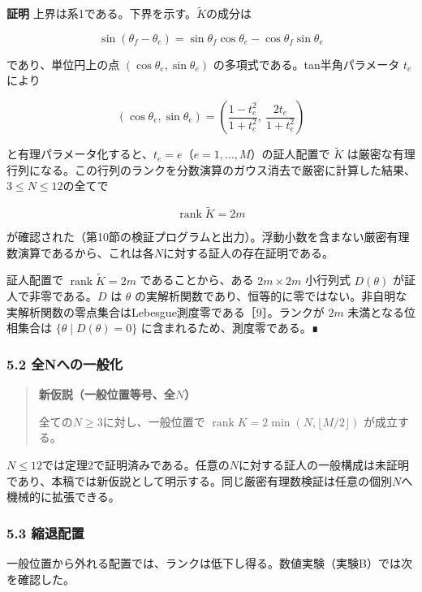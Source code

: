 \documentclass[
  a4paper,
]{ltjsarticle}
\begin{document}
\textbf{証明} 上界は系1である。下界を示す。\(\widetilde K\)の成分は

\[
\sin(\theta_f-\theta_e)
=
\sin\theta_f\cos\theta_e-\cos\theta_f\sin\theta_e
\]

であり、単位円上の点 \((\cos\theta_e,\sin\theta_e)\)
の多項式である。tan半角パラメータ \(t_e\) により

\[
(\cos\theta_e,\sin\theta_e)
=
\left(\frac{1-t_e^2}{1+t_e^2},\ \frac{2t_e}{1+t_e^2}\right)
\]

と有理パラメータ化すると、\(t_e=e\)（\(e=1,\dots,M\)）の証人配置で
\(\widetilde K\)
は厳密な有理行列になる。この行列のランクを分数演算のガウス消去で厳密に計算した結果、\(3\le N\le12\)の全てで

\[
\operatorname{rank}\widetilde K=2m
\]

が確認された（第10節の検証プログラムと出力）。浮動小数を含まない厳密有理数演算であるから、これは各\(N\)に対する証人の存在証明である。

証人配置で \(\operatorname{rank}\widetilde K=2m\) であることから、ある
\(2m\times2m\) 小行列式 \(D(\theta)\) が証人で非零である。\(D\) は
\(\theta\)
の実解析関数であり、恒等的に零ではない。非自明な実解析関数の零点集合はLebesgue測度零である［9］。ランクが
\(2m\) 未満となる位相集合は \(\{\theta\mid D(\theta)=0\}\)
に含まれるため、測度零である。∎

\subsubsection{5.2
全Nへの一般化}\label{ux5168nux3078ux306eux4e00ux822cux5316}

\begin{quote}
\textbf{新仮説（一般位置等号、全\(N\)）}

全ての\(N\ge3\)に対し、一般位置で
\(\operatorname{rank}K=2\min(N,\lfloor M/2\rfloor)\) が成立する。
\end{quote}

\(N\le12\)では定理2で証明済みである。任意の\(N\)に対する証人の一般構成は未証明であり、本稿では新仮説として明示する。同じ厳密有理数検証は任意の個別\(N\)へ機械的に拡張できる。

\subsubsection{5.3 縮退配置}\label{ux7e2eux9000ux914dux7f6e}

一般位置から外れる配置では、ランクは低下し得る。数値実験（実験B）では次を確認した。
\end{document}
